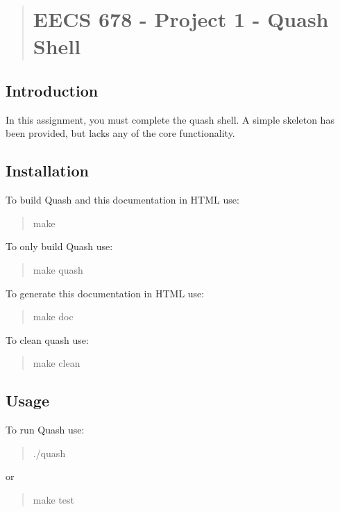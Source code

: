 \begin{quote}
\section*{E\+E\+C\+S 678 -\/ Project 1 -\/ Quash Shell}

\end{quote}


\subsection*{Introduction}

In this assignment, you must complete the quash shell. A simple skeleton has been provided, but lacks any of the core functionality.

\subsection*{Installation}

To build Quash and this documentation in H\+T\+M\+L use\+: \begin{quote}
{\ttfamily make} \end{quote}


To only build Quash use\+: \begin{quote}
{\ttfamily make quash} \end{quote}


To generate this documentation in H\+T\+M\+L use\+: \begin{quote}
{\ttfamily make doc} \end{quote}


To clean quash use\+: \begin{quote}
{\ttfamily make clean} \end{quote}


\subsection*{Usage}

To run Quash use\+: \begin{quote}
{\ttfamily ./quash} \end{quote}
or \begin{quote}
{\ttfamily make test}\end{quote}
